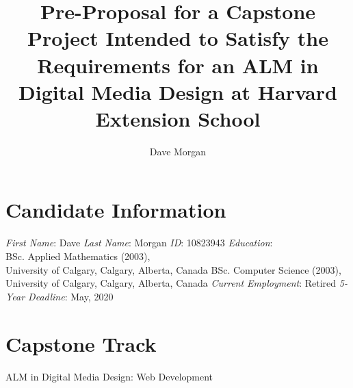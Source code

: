 \documentclass{tufte-handout}
\title{Pre-Proposal for a Capstone Project Intended to Satisfy the Requirements for an ALM in Digital Media Design at Harvard Extension School}
\author[Dave Morgan]{Dave Morgan}
\begin{document}
\raggedright
\maketitle%

%


\section{\Large Candidate Information}\label{sec:candidate}
\emph{First Name}: Dave \parm
\emph{Last Name}: Morgan \parm
\emph{ID}: 10823943 \parm
\emph{Education}: \\
\hspace{0.5cm}BSc. Applied Mathematics (2003), \\
\hspace{0.5cm}University of Calgary, Calgary, Alberta, Canada \parm
\hspace{0.5cm}BSc. Computer Science (2003), \\
\hspace{0.5cm}University of Calgary, Calgary, Alberta, Canada \parm
\emph{Current Employment}: Retired \parm
\emph{5-Year Deadline}: May, 2020 \parb

\section{\Large Capstone Track}
	ALM in Digital Media Design: Web Development
\end{document}
